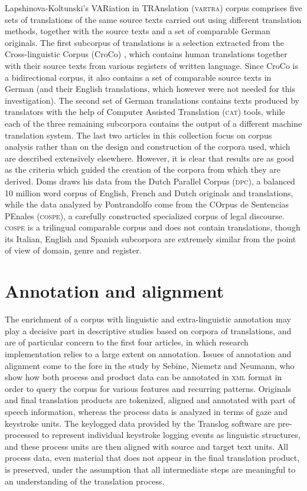 \documentclass[output=paper]{LSP/langsci}
\begin{document}
Lapshinova-Koltunski’s VARiation in TRAnslation  (\textsc{vartra}) corpus comprises five sets of translations of the same source texts carried out using different translation methods, together with the source texts and a set of comparable German originals. The first subcorpus of translations is a selection extracted from the Cross-linguistic Corpus (CroCo) \citep{Croco:2013}, which contains human translations together with their source texts from various registers of written language. Since CroCo is a bidirectional corpus, it also contains a set of comparable source texts in German (and their English translations, which however were not needed for this investigation). The second set of German translations contains texts produced by translators with the help of Computer Assisted Translation (\textsc{cat}) tools, while each of the three remaining subcorpora contains the output of a different machine translation system. The last two articles in this collection focus on corpus analysis rather than on the design and construction of the corpora used, which are described extensively elsewhere. However, it is clear that results are as good as the criteria which guided the creation of the corpora from which they are derived. Doms draws his data from the Dutch Parallel Corpus (\textsc{dpc}), a balanced 10 million word corpus of English, French and Dutch originals and translations, while the data analyzed by Pontrandolfo come from the COrpus de Sentencias PEnales (\textsc{cospe}), a carefully constructed specialized corpus of legal discourse. \textsc{cospe} is a trilingual comparable corpus and does not contain translations, though its Italian, English and Spanish subcorpora are extremely similar from the point of view of domain, genre and register.

\section{Annotation and alignment} 
The enrichment of a corpus with linguistic and extra-linguistic annotation may play a decisive part in descriptive studies based on corpora of translations, and are of particular concern to the first four articles, in which research implementation relies to a large extent on annotation. Issues of annotation and alignment come to the fore in the study by Sebine, Niemetz and Neumann, who show how both process and product data can be annotated in \textsc{xml} format in order to query the corpus for various features and recurring patterns. Originals and final translation products are tokenized, aligned and annotated with part of speech information, whereas the process data is analyzed in terms of gaze and keystroke units. The keylogged data provided by the Translog software are pre-processed to represent individual keystroke logging events as linguistic structures, and these process units are then aligned with source and target text units. All process data, even material that does not appear in the final translation product, is preserved, under the assumption that all intermediate steps are meaningful to an understanding of the translation process. 
\end{document}
